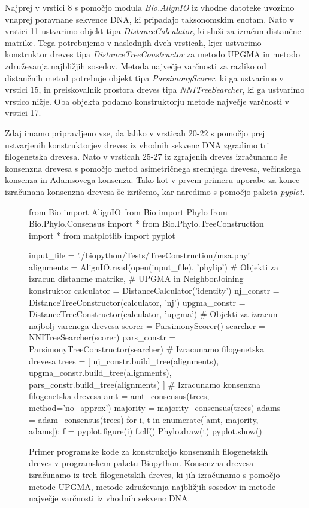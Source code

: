 \documentclass[a4paper, 12pt]{book}
\begin{document}
Najprej v vrstici 8 s pomočjo modula {\it Bio.AlignIO} iz vhodne datoteke uvozimo
vnaprej poravnane sekvence DNA, ki pripadajo taksonomskim enotam. Nato v vrstici 11
ustvarimo objekt tipa {\it DistanceCalculator}, ki služi za izračun distančne matrike. Tega
potrebujemo v naslednjih dveh vrsticah, kjer ustvarimo konstruktor dreves tipa 
{\it DistanceTreeConstructor} za metodo UPGMA in metodo združevanja najbližjih sosedov.
Metoda največje varčnosti za razliko od distančnih metod potrebuje objekt tipa
{\it ParsimonyScorer}, ki ga ustvarimo v vrstici 15, in preiskovalnik prostora 
dreves tipa {\it NNITreeSearcher}, ki ga ustvarimo vrstico nižje. Oba objekta podamo
konstruktorju metode največje varčnosti v vrstici 17.

Zdaj imamo pripravljeno vse, da lahko v vrsticah 20-22 s pomočjo prej ustvarjenih 
konstruktorjev dreves iz vhodnih sekvenc DNA zgradimo tri filogenetska drevesa. 
Nato v vrsticah 25-27 iz zgrajenih dreves izračunamo še konsenzna drevesa s 
pomočjo metod asimetričnega srednjega drevesa, večinskega konsenza in Adamsovega konsenza.
Tako kot v prvem primeru uporabe za konec izračunana konsenzna drevesa še izrišemo, 
kar naredimo s pomočjo paketa {\it pyplot}.


\begin{figure}
\begin{python}
from Bio import AlignIO
from Bio import Phylo
from Bio.Phylo.Consensus import *
from Bio.Phylo.TreeConstruction import *
from matplotlib import pyplot

input_file = './biopython/Tests/TreeConstruction/msa.phy'
alignments = AlignIO.read(open(input_file), 'phylip')
# Objekti za izracun distancne matrike,
# UPGMA in NeighborJoining konstruktor
calculator = DistanceCalculator('identity')
nj_constr = DistanceTreeConstructor(calculator, 'nj')
upgma_constr = DistanceTreeConstructor(calculator, 'upgma')
# Objekti za izracun najbolj varcnega drevesa
scorer = ParsimonyScorer()
searcher = NNITreeSearcher(scorer)
pars_constr = ParsimonyTreeConstructor(searcher)
# Izracunamo filogenetska drevesa
trees = [
    nj_constr.build_tree(alignments),
    upgma_constr.build_tree(alignments),
    pars_constr.build_tree(alignments)
]
# Izracunamo konsenzna filogenetska drevesa
amt = amt_consensus(trees, method='no_approx')
majority = majority_consensus(trees)
adams = adam_consensus(trees)
for i, t in enumerate([amt, majority, adams]):
    f = pyplot.figure(i)
    f.clf()
    Phylo.draw(t)
    pyplot.show()
\end{python}
\caption{
Primer programske kode za konstrukcijo konsenznih filogenetskih dreves v
programskem paketu Biopython. Konsenzna drevesa izračunamo iz treh 
filogenetskih dreves, ki jih izračunamo s pomočjo metode UPGMA, metode združevanja
najbližjih sosedov in metode največje varčnosti iz vhodnih sekvenc DNA. 
}
\label{phylo-trees-example}
\end{figure}
\end{document}
